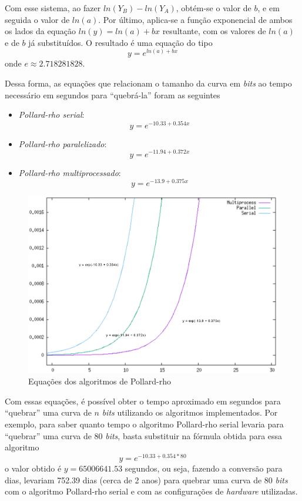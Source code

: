Com esse sistema, ao fazer \(ln(Y_B) - ln(Y_A)\), obtém-se o valor de \(b\), e em seguida o valor de \(ln(a)\). Por último, aplica-se a função exponencial de ambos os lados da equação \(ln(y) = ln(a) + bx\) resultante, com os valores de \(ln(a)\) e de \(b\) já substituídos. O resultado é uma equação do tipo
\begin{equation*}
	y = e^{ln(a) + bx}
\end{equation*}
onde \(e \approx 2.718281828\).

Dessa forma, as equações que relacionam o tamanho da curva em \textit{bits} ao tempo necessário em segundos para ``quebrá-la'' foram as seguintes
\begin{itemize}
	\item \textit{Pollard-rho serial}: $$y = e^{-10.33 + 0.354x}$$
	\item \textit{Pollard-rho paralelizado}: $$y = e^{-11.94 + 0.372x}$$
	\item \textit{Pollard-rho multiprocessado}: $$y = e^{-13.9 + 0.375x}$$
\end{itemize}

\begin{figure}[h]
\centering
\includegraphics[scale=0.6, bb=0 0 515 478]{figuras/pollard_formulas.eps}
\caption{Equações dos algoritmos de Pollard-rho}
\label{eq_graph}
\end{figure}

Com essas equações, é possível obter o tempo aproximado em segundos para ``quebrar'' uma curva de \(n\) \textit{bits} utilizando os algoritmos implementados. Por exemplo, para saber quanto tempo o algoritmo Pollard-rho serial levaria para ``quebrar'' uma curva de 80 \textit{bits}, basta substituir na fórmula obtida para essa algoritmo
\begin{equation*}
	y = e^{-10.33 + 0.354*80}
\end{equation*}
o valor obtido é \(y = 65006641.53\) segundos, ou seja, fazendo a conversão para dias, levariam 752.39 dias (cerca de 2 anos) para quebrar uma curva de 80 \textit{bits} com o algoritmo Pollard-rho serial e com as configurações de \textit{hardware} utilizadas.

